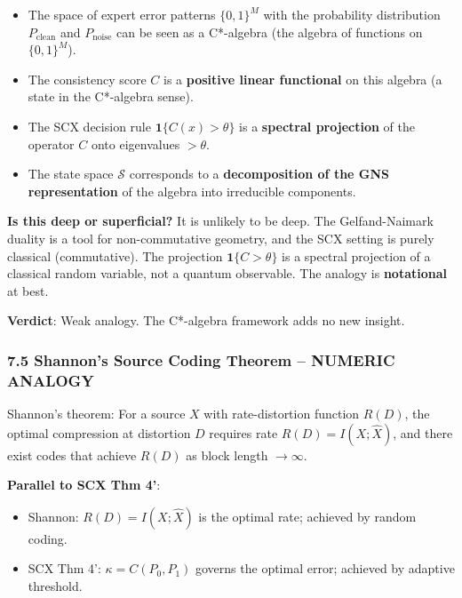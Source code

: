 \documentclass[
  12pt,
]{article}
\providecommand{\tightlist}{%
  \setlength{\itemsep}{0pt}\setlength{\parskip}{0pt}}
\begin{document}
\begin{itemize}
\tightlist
\item
  The space of expert error patterns \(\{0,1\}^M\) with the probability
  distribution \(P_{\text{clean}}\) and \(P_{\text{noise}}\) can be seen
  as a C*-algebra (the algebra of functions on \(\{0,1\}^M\)).
\item
  The consistency score \(C\) is a \textbf{positive linear functional}
  on this algebra (a state in the C*-algebra sense).
\item
  The SCX decision rule \(\mathbf{1}\{C(x) > \theta\}\) is a
  \textbf{spectral projection} of the operator \(C\) onto eigenvalues
  \(> \theta\).
\item
  The state space \(\mathcal{S}\) corresponds to a \textbf{decomposition
  of the GNS representation} of the algebra into irreducible components.
\end{itemize}

\textbf{Is this deep or superficial?} It is unlikely to be deep. The
Gelfand-Naimark duality is a tool for non-commutative geometry, and the
SCX setting is purely classical (commutative). The projection
\(\mathbf{1}\{C > \theta\}\) is a spectral projection of a classical
random variable, not a quantum observable. The analogy is
\textbf{notational} at best.

\textbf{Verdict}: Weak analogy. The C*-algebra framework adds no new
insight.

\subsubsection{7.5 Shannon's Source Coding Theorem -- NUMERIC
ANALOGY}\label{shannons-source-coding-theorem-numeric-analogy}

Shannon's theorem: For a source \(X\) with rate-distortion function
\(R(D)\), the optimal compression at distortion \(D\) requires rate
\(R(D) = I(X; \hat{X})\), and there exist codes that achieve \(R(D)\) as
block length \(\to \infty\).

\textbf{Parallel to SCX Thm 4'}:

\begin{itemize}
\tightlist
\item
  Shannon: \(R(D) = I(X; \hat{X})\) is the optimal rate; achieved by
  random coding.
\item
  SCX Thm 4': \(\kappa = C(P_0, P_1)\) governs the optimal error;
  achieved by adaptive threshold.
\end{itemize}
\end{document}
